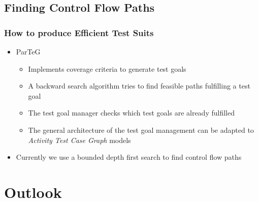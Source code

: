 \documentclass{beamer}
\begin{document}
\subsection{Finding Control Flow Paths}

\begin{frame}
\frametitle{How to produce Efficient Test Suits}
\begin{itemize}
\item ParTeG\cite{ParTeG}
\begin{itemize}
\item Implements coverage criteria to generate test goals
\item A backward search algorithm tries to find feasible paths fulfilling a test goal
\item The test goal manager checks which test goals are already fulfilled
\item The general architecture of the test goal management can be adapted to \emph{Activity Test Case Graph} models
\end{itemize}
\item Currently we use a bounded depth first search to find control flow paths
\end{itemize}
\end{frame}


\section{Outlook} 
\end{document}
